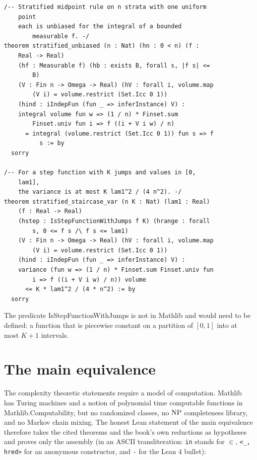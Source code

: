 \begin{footnotesize}
\begin{verbatim}
/-- Stratified midpoint rule on n strata with one uniform
    point
    each is unbiased for the integral of a bounded
        measurable f. -/
theorem stratified_unbiased (n : Nat) (hn : 0 < n) (f :
    Real -> Real)
    (hf : Measurable f) (hb : exists B, forall s, |f s| <=
        B)
    (V : Fin n -> Omega -> Real) (hV : forall i, volume.map
        (V i) = volume.restrict (Set.Icc 0 1))
    (hind : iIndepFun (fun _ => inferInstance) V) :
    integral volume fun w => (1 / n) * Finset.sum
        Finset.univ fun i => f ((i + V i w) / n)
      = integral (volume.restrict (Set.Icc 0 1)) fun s => f
          s := by
  sorry

/-- For a step function with K jumps and values in [0,
    lam1],
    the variance is at most K lam1^2 / (4 n^2). -/
theorem stratified_staircase_var (n K : Nat) (lam1 : Real)
    (f : Real -> Real)
    (hstep : IsStepFunctionWithJumps f K) (hrange : forall
        s, 0 <= f s /\ f s <= lam1)
    (V : Fin n -> Omega -> Real) (hV : forall i, volume.map
        (V i) = volume.restrict (Set.Icc 0 1))
    (hind : iIndepFun (fun _ => inferInstance) V) :
    variance (fun w => (1 / n) * Finset.sum Finset.univ fun
        i => f ((i + V i w) / n)) volume
      <= K * lam1^2 / (4 * n^2) := by
  sorry
\end{verbatim}
\end{footnotesize}

The predicate IsStepFunctionWithJumps is not in Mathlib and would need to be defined: a function that is piecewise constant on a partition of $[0, 1]$ into at most $K + 1$ intervals.

\section{The main equivalence}

The complexity theoretic statements require a model of computation. Mathlib has Turing machines and a notion of polynomial time computable functions in Mathlib.Computability, but no randomized classes, no $\mathrm{NP}$ completeness library, and no Markov chain mixing. The honest Lean statement of the main equivalence therefore takes the cited theorems and the book's own reductions as hypotheses and proves only the assembly (in an ASCII transliteration: \texttt{in} stands for $\in$, \texttt{<\_, hred>} for an anonymous constructor, and \texttt{-} for the Lean 4 bullet):

